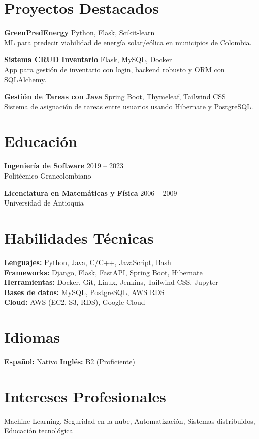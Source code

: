 \documentclass[a4paper,10pt]{article}
\begin{document}
	\section*{Proyectos Destacados}
	\textbf{GreenPredEnergy} \hfill Python, Flask, Scikit-learn \\
	ML para predecir viabilidad de energía solar/eólica en municipios de Colombia.
	
	\textbf{Sistema CRUD Inventario} \hfill Flask, MySQL, Docker \\
	App para gestión de inventario con login, backend robusto y ORM con SQLAlchemy.
	
	\textbf{Gestión de Tareas con Java} \hfill Spring Boot, Thymeleaf, Tailwind CSS \\
	Sistema de asignación de tareas entre usuarios usando Hibernate y PostgreSQL.
	
	\section*{Educación}
	\textbf{Ingeniería de Software} \hfill 2019 -- 2023 \\
	Politécnico Grancolombiano
	
	\textbf{Licenciatura en Matemáticas y Física} \hfill 2006 -- 2009 \\
	Universidad de Antioquia
	
	
	\section*{Habilidades Técnicas}
	\textbf{Lenguajes:} Python, Java, C/C++, JavaScript, Bash \\
	\textbf{Frameworks:} Django, Flask, FastAPI, Spring Boot, Hibernate \\
	\textbf{Herramientas:} Docker, Git, Linux, Jenkins, Tailwind CSS, Jupyter \\
	\textbf{Bases de datos:} MySQL, PostgreSQL, AWS RDS \\
	\textbf{Cloud:} AWS (EC2, S3, RDS), Google Cloud
	
	\section*{Idiomas}
	\textbf{Español:} Nativo \quad \textbf{Inglés:} B2 (Proficiente)
	
	\section*{Intereses Profesionales}
	Machine Learning, Seguridad en la nube, Automatización, Sistemas distribuidos, Educación tecnológica
	
\end{document}
